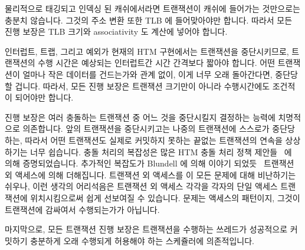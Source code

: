 \fi

물리적으로 태깅되고 인덱싱 된 캐쉬에서라면 트랜잭션이 캐쉬에 들어가는
것만으로는 충분치 않습니다.
그것의 주소 변환 또한 TLB 에 들어맞아야만 합니다.
따라서 모든 진행 보장은 TLB 크기와 associativity 도 계산에 넣어야 합니다.

인터럽트, 트랩, 그리고 예외가 현재의 HTM 구현에서는 트랜잭션을 중단시키므로,
트랜잭션의 수행 시간은 예상되는 인터럽트간 시간 간격보다 짧아야 합니다.
어떤 트랜잭션이 얼마나 작은 데이터를 건드는가와 관계 없이, 이게 너무 오래
돌아간다면, 중단당할 겁니다.
따라서, 모든 진행 보장은 트랜잭션 크기만이 아니라 수행시간에도 조건적이
되어야만 합니다.

\iffalse

Given a physically tagged and indexed cache, it is not enough for the
transaction to fit in the cache.
Its address translations must also fit in the TLB\@.
Any forward-progress guarantees must therefore also take TLB size
and associativity into account.

Given that interrupts, traps, and exceptions abort transactions in current
HTM implementations, it is necessary that the execution duration of
a given transaction be shorter than the expected interval between
interrupts.
No matter how little data a given transaction touches, if it runs too
long, it will be aborted.
Therefore, any forward-progress guarantees must be conditioned not only
on transaction size, but also on transaction duration.

\fi

진행 보장은 여러 충돌하는 트랜잭션 중 어느 것을 중단시킬지 결정하는 능력에
치명적으로 의존합니다.
앞의 트랜잭션을 중단시키고는 나중의 트랜잭션에 스스로가 중단당하는, 따라서 어떤
트랜잭션도 실제로 커밋하지 못하는 끝없는 트랜잭션의 연속을 상상하기는 너무
쉽습니다.
충돌 처리의 복잡성은 많은 HTM 충돌 처리 정책
제안들~\cite{EgeAkpinar2011HTM2TLE,YujieLiu2011ToxicTransactions} 에 의해
증명되었습니다.
추가적인 복잡도가 Blundell 에 의해 이야기 되었듯~\cite{Blundell2006TMdeadlock}
트랜잭션 외 액세스에 의해 더해집니다.
트랜잭션 외 액세스를 이 모든 문제에 대해 비난하기는 쉬우나, 이런 생각의
어리석음은 트랜잭션 외 액세스 각각을 각자의 단일 액세스 트랜잭션에
위치시킴으로써 쉽게 선보여질 수 있습니다.
문제는 액세스의 패턴이지, 그것이 트랜잭션에 감싸여서 수행되는가가 아닙니다.

마지막으로, 모든 트랜잭션 진행 보장은 트랜잭션을 수행하는 쓰레드가 성공적으로
커밋하기 충분하게 오래 수행되게 허용해야 하는 스케쥴러에 의존적입니다. 

\iffalse

